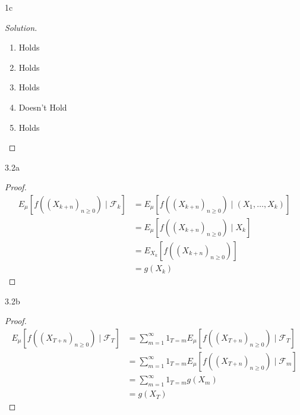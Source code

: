 \documentclass{article}
\newcommand{\F}{\mathcal{F}}
\newenvironment{solution}
{\renewcommand\qedsymbol{$\blacksquare$}\begin{proof}[Solution]}
{\end{proof}}
\begin{document}
\begin{PROB}{1c}\label{Problem 1c.}
    
\end{PROB}
\begin{solution}
    \begin{enumerate}
        \item Holds
        \item Holds
        \item Holds
        \item Doesn't Hold
        \item Holds
    \end{enumerate}
    
\end{solution}

\bigskip

\begin{PROB}{3.2a}\label{Problem 3.2a.}
    
\end{PROB}
\begin{proof}
    \begin{align*}
        E_\mu[f((X_{k +n})_{n \geq 0}) \mid \F_k] &= E_\mu[f((X_{k +n})_{n \geq 0}) \mid (X_1, \dots, X_k)] \\
        &= E_\mu[f((X_{k +n})_{n \geq 0}) \mid X_k] \\
        &=  E_{X_k}[f((X_{k +n})_{n \geq 0})] \\
        &= g(X_k)
    \end{align*} 
\end{proof}

\begin{PROB}{3.2b}\label{Problem 3.2b.}
\end{PROB}
\begin{proof}
    \begin{align*}
        E_{\mu}[f((X_{T + n})_{n \geq 0}) \mid \F_T] &= \sum_{m = 1}^{\infty}1_{T = m}E_{\mu}[f((X_{T + n})_{n \geq 0}) \mid \F_T] \\
        &= \sum_{m = 1}^{\infty}1_{T = m}E_{\mu}[f((X_{T + n})_{n \geq 0}) \mid \F_m] \\
        &= \sum_{m = 1}^{\infty}1_{T = m}g(X_m) \\
        &= g(X_T)
    \end{align*}
\end{proof}

\bigskip
\end{document}

